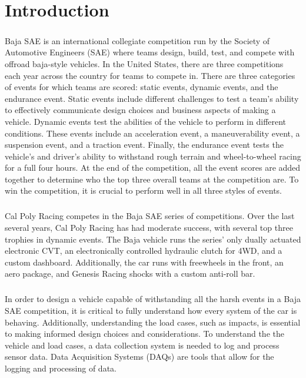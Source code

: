 \chapter{Introduction}

\paragraph{}
Baja SAE is an international collegiate competition run by the Society of Automotive Engineers (SAE) where teams design, build, test, and compete with offroad baja-style vehicles.
In the United States, there are three competitions each year across the country for teams to compete in. 
There are three categories of events for which teams are scored: static events, dynamic events, and the endurance event.  
Static events include different challenges to test a team's ability to effectively communicate design choices and business aspects of making a vehicle.  
Dynamic events test the abilities of the vehicle to perform in different conditions.  
These events include an acceleration event, a maneuverability event, a suspension event, and a traction event.  
Finally, the endurance event tests the vehicle's and driver's ability to withstand rough terrain and wheel-to-wheel racing for a full four hours.
At the end of the competition, all the event scores are added together to determine who the top three overall teams at the competition are.
To win the competition, it is crucial to perform well in all three styles of events.

\paragraph{}
Cal Poly Racing competes in the Baja SAE series of competitions.
Over the last several years, Cal Poly Racing has had moderate success, with several top three trophies in dynamic events.
The Baja vehicle runs the series' only dually actuated electronic CVT, an electronically controlled hydraulic clutch for 4WD, and a custom dashboard.
Additionally, the car runs with freewheels in the front, an aero package, and Genesis Racing shocks with a custom anti-roll bar.

\paragraph{}
In order to design a vehicle capable of withstanding all the harsh events in a Baja SAE competition, it is critical to fully understand how every system of the car is behaving.
Additionally, understanding the load cases, such as impacts, is essential to making informed design choices and considerations.
To understand the the vehicle and load cases, a data collection system is needed to log and process sensor data.
Data Acquisition Systems (DAQs) are tools that allow for the logging and processing of data.

\paragraph{}

